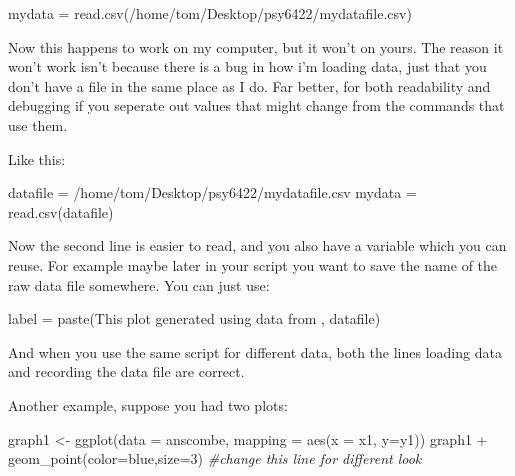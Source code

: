 \documentclass[
]{book}
\newenvironment{Shaded}{\begin{snugshade}}{\end{snugshade}}
\newcommand{\AttributeTok}[1]{\textcolor[rgb]{0.77,0.63,0.00}{#1}}
\newcommand{\CommentTok}[1]{\textcolor[rgb]{0.56,0.35,0.01}{\textit{#1}}}
\newcommand{\DecValTok}[1]{\textcolor[rgb]{0.00,0.00,0.81}{#1}}
\newcommand{\FunctionTok}[1]{\textcolor[rgb]{0.00,0.00,0.00}{#1}}
\newcommand{\NormalTok}[1]{#1}
\newcommand{\OtherTok}[1]{\textcolor[rgb]{0.56,0.35,0.01}{#1}}
\newcommand{\SpecialCharTok}[1]{\textcolor[rgb]{0.00,0.00,0.00}{#1}}
\newcommand{\StringTok}[1]{\textcolor[rgb]{0.31,0.60,0.02}{#1}}
\begin{document}
\begin{Shaded}
\begin{Highlighting}[]
\NormalTok{mydata }\OtherTok{=} \FunctionTok{read.csv}\NormalTok{(}\StringTok{\textquotesingle{}/home/tom/Desktop/psy6422/mydatafile.csv\textquotesingle{}}\NormalTok{)}
\end{Highlighting}
\end{Shaded}

Now this happens to work on my computer, but it won't on yours. The reason it won't work isn't because there is a bug in how i'm loading data, just that you don't have a file in the same place as I do. Far better, for both readability and debugging if you seperate out values that might change from the commands that use them.

Like this:

\begin{Shaded}
\begin{Highlighting}[]
\NormalTok{datafile }\OtherTok{=} \StringTok{\textquotesingle{}/home/tom/Desktop/psy6422/mydatafile.csv\textquotesingle{}}
\NormalTok{mydata }\OtherTok{=} \FunctionTok{read.csv}\NormalTok{(datafile)}
\end{Highlighting}
\end{Shaded}

Now the second line is easier to read, and you also have a variable which you can reuse. For example maybe later in your script you want to save the name of the raw data file somewhere. You can just use:

\begin{Shaded}
\begin{Highlighting}[]
\NormalTok{label }\OtherTok{=} \FunctionTok{paste}\NormalTok{(}\StringTok{\textquotesingle{}This plot generated using data from \textquotesingle{}}\NormalTok{, datafile)}
\end{Highlighting}
\end{Shaded}

And when you use the same script for different data, both the lines loading data and recording the data file are correct.

Another example, suppose you had two plots:

\begin{Shaded}
\begin{Highlighting}[]
\NormalTok{graph1 }\OtherTok{\textless{}{-}} \FunctionTok{ggplot}\NormalTok{(}\AttributeTok{data =}\NormalTok{ anscombe, }\AttributeTok{mapping =} \FunctionTok{aes}\NormalTok{(}\AttributeTok{x =}\NormalTok{ x1, }\AttributeTok{y=}\NormalTok{y1))}
\NormalTok{graph1 }\SpecialCharTok{+} \FunctionTok{geom\_point}\NormalTok{(}\AttributeTok{color=}\StringTok{\textquotesingle{}blue\textquotesingle{}}\NormalTok{,}\AttributeTok{size=}\DecValTok{3}\NormalTok{) }\CommentTok{\#change this line for different look}
\end{Highlighting}
\end{Shaded}
\end{document}
